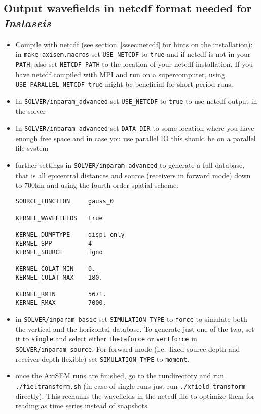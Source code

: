 \documentclass{article}
\begin{document}
\subsection{Output wavefields in netcdf format needed for \textit{Instaseis}}

\begin{itemize}
    \item Compile with netcdf (see section~\ref{sssec:netcdf} for hints on the
    installation): in \verb|make_axisem.macros| set \verb|USE_NETCDF| to \verb|true|
    and if netcdf is not in your \verb|PATH|, also set \verb|NETCDF_PATH| to the location
    of your netcdf installation. If you have netcdf compiled with MPI and run on a
    supercomputer, using \verb|USE_PARALLEL_NETCDF true| might be beneficial for short
    period runs.
    \item In \verb|SOLVER/inparam_advanced| set \verb|USE_NETCDF| to \verb|true| to
    use netcdf output in the solver
    \item In \verb|SOLVER/inparam_advanced| set \verb|DATA_DIR| to some location where you
    have enough free space and in case you use parallel IO this should be on a parallel
    file system
    \item further settings in \verb|SOLVER/inparam_advanced| to generate a full database,
    that is all epicentral distances and source (receivers in forward mode)
    down to 700km and using the fourth order spatial scheme:

\begin{verbatim}
SOURCE_FUNCTION     gauss_0

KERNEL_WAVEFIELDS   true

KERNEL_DUMPTYPE     displ_only
KERNEL_SPP          4
KERNEL_SOURCE       igno

KERNEL_COLAT_MIN    0.
KERNEL_COLAT_MAX    180.

KERNEL_RMIN         5671.
KERNEL_RMAX         7000.
\end{verbatim}

    \item in \verb|SOLVER/inparam_basic| set \verb|SIMULATION_TYPE| to \verb|force| to
    simulate both the vertical and the horizontal database. To generate just one of the
    two, set it to \verb|single| and select either \verb|thetaforce| or \verb|vertforce|
    in \\\verb|SOLVER/inparam_source|. For forward mode (i.e.\ fixed source
    depth and receiver depth flexible) set \verb|SIMULATION_TYPE| to
    \verb|moment|.

    \item once the AxiSEM runs are finished, go to the rundirectory and run
    \verb|./fieltransform.sh| (in case of single runs just run \verb|./xfield_transform|
    directly). This rechunks the wavefields in the netcdf file to optimize them for
    reading as time series instead of snapshots.

\end{itemize}
\end{document}
